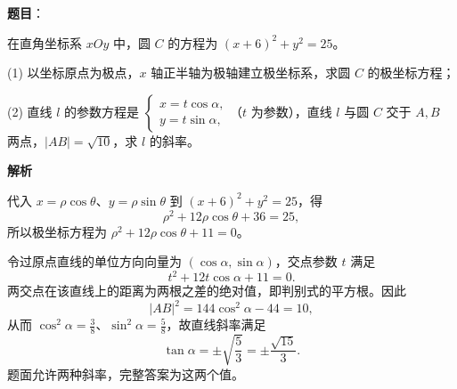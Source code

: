 \begin{answer}

\textbf{题目}：

在直角坐标系 \(xOy\) 中，圆 \(C\) 的方程为 \((x+6)^2+y^2=25\)。

   (1) 以坐标原点为极点，\(x\) 轴正半轴为极轴建立极坐标系，求圆 \(C\) 的极坐标方程；

   (2) 直线 \(l\) 的参数方程是 \(\begin{cases}x=t\cos\alpha,\\y=t\sin\alpha,\end{cases}\)（\(t\) 为参数），直线 \(l\) 与圆 \(C\) 交于 \(A,B\) 两点，\(|AB|=\sqrt{10}\)，求 \(l\) 的斜率。

\textbf{解析}


代入 \(x=\rho\cos\theta\)、\(y=\rho\sin\theta\) 到 \((x+6)^2+y^2=25\)，得
\nopagebreak[4]
\[
\rho^2+12\rho\cos\theta+36=25,
\]
所以极坐标方程为 \(\rho^2+12\rho\cos\theta+11=0\)。


令过原点直线的单位方向向量为 \((\cos\alpha,\sin\alpha)\)，交点参数 \(t\) 满足
\nopagebreak[4]
\[
t^2+12t\cos\alpha+11=0.
\]
两交点在该直线上的距离为两根之差的绝对值，即判别式的平方根。因此
\nopagebreak[4]
\[
|AB|^2=144\cos^2\alpha-44=10,
\]
从而 \(\cos^2\alpha=\frac38\)、\(\sin^2\alpha=\frac58\)，故直线斜率满足
\nopagebreak[4]
\[
\tan\alpha=\pm\sqrt{\frac53}=\pm\frac{\sqrt{15}}3.
\]
题面允许两种斜率，完整答案为这两个值。



\end{answer}
